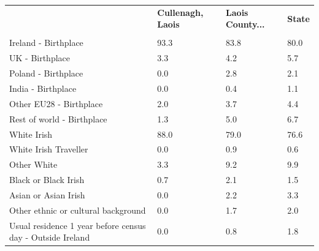\documentclass{article}
\begin{document}
\pagebreak
\begin{table}[h]	
\centering
		\begin{tabular}{KTTT}
  \hline
& \textbf{Cullenagh, Laois} & \textbf{Laois County...} & \textbf{State}\\ 
  \hline
    \\ 
    \hline
Ireland - Birthplace & 93.3& 83.8& 80.0\\
UK - Birthplace & 3.3& 4.2& 5.7\\
Poland - Birthplace & 0.0& 2.8& 2.1\\
India - Birthplace & 0.0& 0.4& 1.1\\
Other EU28 - Birthplace & 2.0& 3.7& 4.4\\
Rest of world - Birthplace & 1.3& 5.0& 6.7\\
    \hline
White Irish & 88.0& 79.0& 76.6\\
White Irish Traveller & 0.0& 0.9& 0.6\\
Other White & 3.3& 9.2& 9.9\\
Black or Black Irish & 0.7& 2.1& 1.5\\
Asian or Asian Irish & 0.0& 2.2& 3.3\\
Other ethnic or cultural background & 0.0& 1.7& 2.0\\
    \hline
Usual residence 1 year before census day - Outside Ireland & 0.0& 0.8& 1.8\\


\end{tabular}
\end{table}
\end{document}
